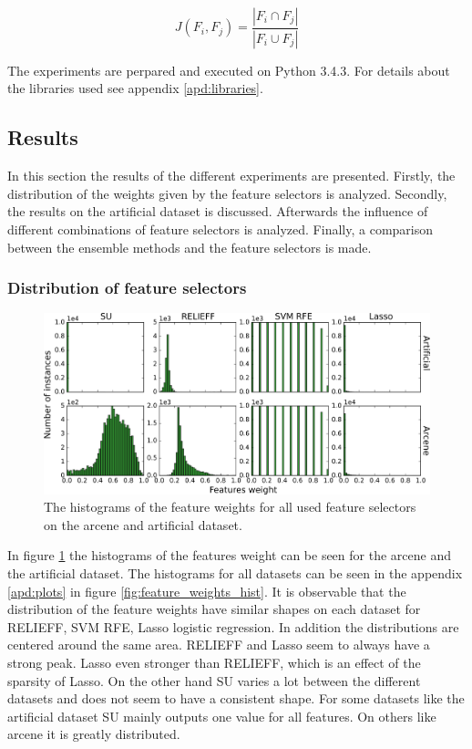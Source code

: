 \documentclass[twoside,11pt]{article}
\begin{document}
\begin{equation}
J(F_i, F_j) = \frac{| F_i \cap F_j |}{| F_i \cup F_j |}
\end{equation}

The experiments are perpared and executed on Python 3.4.3. For details about the libraries used see appendix \ref{apd:libraries}.

\subsection{Results}
In this section the results of the different experiments are presented. Firstly, the distribution of the weights given by the feature selectors is analyzed. Secondly, the results on the artificial dataset is discussed. Afterwards the influence of different combinations of feature selectors is analyzed. Finally, a comparison between the ensemble methods and the feature selectors is made.

\subsubsection{Distribution of feature selectors}
\begin{figure}[h!]
  \centering
    \includegraphics[width=\textwidth]{images/feature_weights_hist_arcene_artificial.png}
  \caption{The histograms of the feature weights for all used feature selectors on the arcene and artificial dataset.}
  \label{fig:feature_weights_hist_arcene_artificial}
\end{figure}

In figure \ref{fig:feature_weights_hist_arcene_artificial} the histograms of the features weight can be seen for the arcene and the artificial dataset. The histograms for all datasets can be seen in the appendix \ref{apd:plots} in figure \ref{fig:feature_weights_hist}.
It is observable that the distribution of the feature weights have similar shapes on each dataset for RELIEFF, SVM RFE, Lasso logistic regression. In addition the distributions are centered around the same area. RELIEFF and Lasso seem to always have a strong peak. Lasso even stronger than RELIEFF, which is an effect of the sparsity of Lasso. On the other hand SU varies a lot between the different datasets and does not seem to have a consistent shape. For some datasets like the artificial dataset SU mainly outputs one value for all features. On others like arcene it is greatly distributed. 
\end{document}
